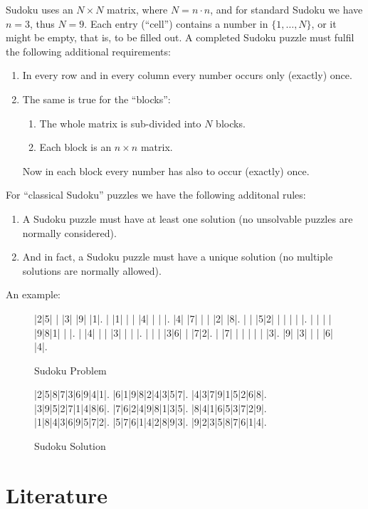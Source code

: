 \documentclass[11pt]{report}
\begin{document}
Sudoku uses an $N \times N$ matrix, where $N = n \cdot n$, and for standard Sudoku we have $n = 3$, thus $N = 9$. Each entry (``cell'') contains a number in $\{1, \dots, N\}$, or it might be empty, that is, to be filled out. A completed Sudoku puzzle must fulfil the following additional requirements:
\begin{enumerate}
\item In every row and in every column every number occurs only (exactly) once.
\item The same is true for the ``blocks'':
  \begin{enumerate}
  \item The whole matrix is sub-divided into $N$ blocks.
  \item Each block is an $n \times n$ matrix.
  \end{enumerate}
  Now in each block every number has also to occur (exactly) once.
\end{enumerate}
For ``classical Sudoku'' puzzles we have the following additonal rules:
\begin{enumerate}
\item A Sudoku puzzle must have at least one solution (no unsolvable puzzles are normally considered).
\item And in fact, a Sudoku puzzle must have a unique solution (no multiple solutions are normally allowed).
\end{enumerate}
An example:

\setlength\sudokusize{8cm}
\begin{figure}
\begin{sudoku}
 |2|5| | |3| |9| |1|.
 | |1| | | |4| | | |.
 |4| |7| | | |2| |8|.
 | | |5|2| | | | | |.
 | | | | |9|8|1| | |.
 | |4| | | |3| | | |.
 | | | |3|6| | |7|2|.
 | |7| | | | | | |3|.
 |9| |3| | | |6| |4|.
\end{sudoku}
\caption{Sudoku Problem}
\end{figure}

\begin{figure}
\begin{sudoku}
  |2|5|8|7|3|6|9|4|1|.
  |6|1|9|8|2|4|3|5|7|.
  |4|3|7|9|1|5|2|6|8|.
  |3|9|5|2|7|1|4|8|6|.
  |7|6|2|4|9|8|1|3|5|.
  |8|4|1|6|5|3|7|2|9|.
  |1|8|4|3|6|9|5|7|2|.
  |5|7|6|1|4|2|8|9|3|.
  |9|2|3|5|8|7|6|1|4|.
\end{sudoku}
\caption{Sudoku Solution}
\end{figure}





\section{Literature}
\label{sec:introLiterature}
\end{document}
